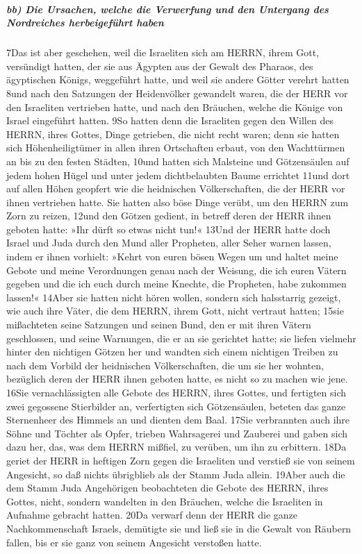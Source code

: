 \hypertarget{bb-die-ursachen-welche-die-verwerfung-und-den-untergang-des-nordreiches-herbeigefuxfchrt-haben}{%
\subparagraph{bb) Die Ursachen, welche die Verwerfung und den Untergang
des Nordreiches herbeigeführt
haben}\label{bb-die-ursachen-welche-die-verwerfung-und-den-untergang-des-nordreiches-herbeigefuxfchrt-haben}}

7Das ist aber geschehen, weil die Israeliten sich am HERRN, ihrem Gott,
versündigt hatten, der sie aus Ägypten aus der Gewalt des Pharaos, des
ägyptischen Königs, weggeführt hatte, und weil sie andere Götter verehrt
hatten 8und nach den Satzungen der Heidenvölker gewandelt waren, die der
HERR vor den Israeliten vertrieben hatte, und nach den Bräuchen, welche
die Könige von Israel eingeführt hatten. 9So hatten denn die Israeliten
gegen den Willen des HERRN, ihres Gottes, Dinge getrieben, die nicht
recht waren; denn sie hatten sich Höhenheiligtümer in allen ihren
Ortschaften erbaut, von den Wachttürmen an bis zu den festen Städten,
10und hatten sich Malsteine und Götzensäulen auf jedem hohen Hügel und
unter jedem dichtbelaubten Baume errichtet 11und dort auf allen Höhen
geopfert wie die heidnischen Völkerschaften, die der HERR vor ihnen
vertrieben hatte. Sie hatten also böse Dinge verübt, um den HERRN zum
Zorn zu reizen, 12und den Götzen gedient, in betreff deren der HERR
ihnen geboten hatte: »Ihr dürft so etwas nicht tun!« 13Und der HERR
hatte doch Israel und Juda durch den Mund aller Propheten, aller Seher
warnen lassen, indem er ihnen vorhielt: »Kehrt von euren bösen Wegen um
und haltet meine Gebote und meine Verordnungen genau nach der Weisung,
die ich euren Vätern gegeben und die ich euch durch meine Knechte, die
Propheten, habe zukommen lassen!« 14Aber sie hatten nicht hören wollen,
sondern sich halsstarrig gezeigt, wie auch ihre Väter, die dem HERRN,
ihrem Gott, nicht vertraut hatten; 15sie mißachteten seine Satzungen und
seinen Bund, den er mit ihren Vätern geschlossen, und seine Warnungen,
die er an sie gerichtet hatte; sie liefen vielmehr hinter den nichtigen
Götzen her und wandten sich einem nichtigen Treiben zu nach dem Vorbild
der heidnischen Völkerschaften, die um sie her wohnten, bezüglich deren
der HERR ihnen geboten hatte, es nicht so zu machen wie jene. 16Sie
vernachlässigten alle Gebote des HERRN, ihres Gottes, und fertigten sich
zwei gegossene Stierbilder an, verfertigten sich Götzensäulen, beteten
das ganze Sternenheer des Himmels an und dienten dem Baal. 17Sie
verbrannten auch ihre Söhne und Töchter als Opfer, trieben Wahrsagerei
und Zauberei und gaben sich dazu her, das, was dem HERRN mißfiel, zu
verüben, um ihn zu erbittern. 18Da geriet der HERR in heftigen Zorn
gegen die Israeliten und verstieß sie von seinem Angesicht, so daß
nichts übrigblieb als der Stamm Juda allein. 19Aber auch die dem Stamm
Juda Angehörigen beobachteten die Gebote des HERRN, ihres Gottes, nicht,
sondern wandelten in den Bräuchen, welche die Israeliten in Aufnahme
gebracht hatten. 20Da verwarf denn der HERR die ganze Nachkommenschaft
Israels, demütigte sie und ließ sie in die Gewalt von Räubern fallen,
bis er sie ganz von seinem Angesicht verstoßen hatte.

